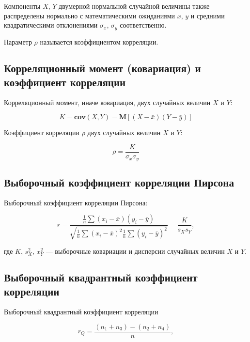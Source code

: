 \documentclass[12pt,a4paper]{article}
\begin{document}
	Компоненты \( X \), \( Y \) двумерной нормальной случайной величины также
	распределены нормально с математическими ожиданиями \( x \), \( y \) и
	средними квадратическими отклонениями \( \sigma_x \), \( \sigma_y \)
	соответственно.

	Параметр \( \rho \) называется коэффициентом корреляции.

	\subsection{Корреляционный момент (ковариация) и коэффициент корреляции}

	Корреляционный момент, иначе ковариация, двух случайных величин \( X \) и
	\( Y \):

	\begin{equation} \label{eq:covariance}
		K = \mathbf{cov}(X, Y) = \mathbf{M}[(X - \bar x)(Y - \bar y)]
	\end{equation}

	Коэффициент корреляции \( \rho \) двух случайных величин \( X \) и
	\( Y \):

	\begin{equation} \label{eq:correlation}
		\rho = \frac{K}{\sigma_x \sigma_y}
	\end{equation}

	\subsection{Выборочный коэффициент корреляции Пирсона}

	Выборочный коэффициент корреляции Пирсона:

	\begin{equation} \label{eq:pearson_corr}
		r = \frac{\frac{1}{n} \sum (x_i - \bar x)(y_i - \bar y)}{\sqrt{\frac{1}{n}
		\sum (x_i - \bar x)^2 \frac{1}{n} \sum (y_i - \bar y)^2}} =
		\frac{K}{s_X s_Y},
	\end{equation}

	где \( K \), \( s_X^2 \), \( x_Y^2 \) — выборочные ковариации и дисперсии
	случайных величин \( X \) и \( Y \).

	\subsection{Выборочный квадрантный коэффициент корреляции}

	Выборочный квадрантный коэффициент корреляции

	\begin{equation} \label{eq:quadrant_corr}
		r_Q = \frac{(n_1 + n_3) - (n_2 + n_4)}{n},
	\end{equation}
\end{document}
